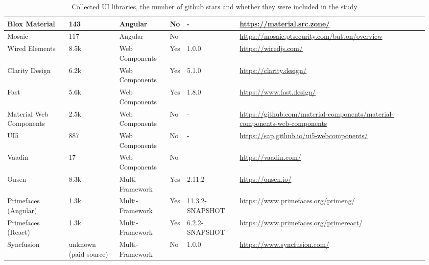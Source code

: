 \begin{table*}[t]
\begin{tabularx}{\textwidth}{l|l|l|l|l|X}
		Blox Material           & 143                   & Angular               & No                & -                & \url{https://material.src.zone/}                                                 \\ \hline
		Mosaic                  & 117                   & Angular               & No                & -                & \url{https://mosaic.ptsecurity.com/button/overview }                             \\ \hline
		Wired Elements          & 8.5k                  & Web Components        & Yes               & 1.0.0            & \url{https://wiredjs.com/}                                                       \\ \hline
		Clarity Design          & 6.2k                  & Web Components        & Yes               & 5.1.0            & \url{https://clarity.design/}                                                    \\ \hline
		Fast                    & 5.6k                  & Web Components        & Yes               & 1.8.0            & \url{https://www.fast.design/}                                                   \\ \hline
		Material Web Components & 2.5k                  & Web Components        & No                & -                & \url{https://github.com/material-components/material-components-web-components } \\ \hline
		UI5                     & 887                   & Web Components        & No                & -                & \url{https://sap.github.io/ui5-webcomponents/}                                   \\ \hline
		Vaadin                  & 17                    & Web Components        & No                & -                & \url{https://vaadin.com/}                                                        \\ \hline
		Onsen                   & 8.3k                  & Multi-Framework       & Yes               & 2.11.2           & \url{https://onsen.io/}                                                          \\ \hline
		Primefaces (Angular)    & 1.3k                  & Multi-Framework       & Yes               & 11.3.2-SNAPSHOT  & \url{https://www.primefaces.org/primeng/}                                                \\ \hline
		Primefaces (React)      & 1.3k                  & Multi-Framework       & Yes               & 6.2.2-SNAPSHOT   & \url{https://www.primefaces.org/primereact/}                                                \\ \hline
		Syncfusion              & unknown (paid source) & Multi-Framework       & No                & 1.0.0            & \url{https://www.syncfusion.com/}
	\end{tabularx}
	\caption{Collected UI libraries, the number of github stars and whether they were included in the study}
	\label{tab:design:ui-libraries}
\end{table*}
